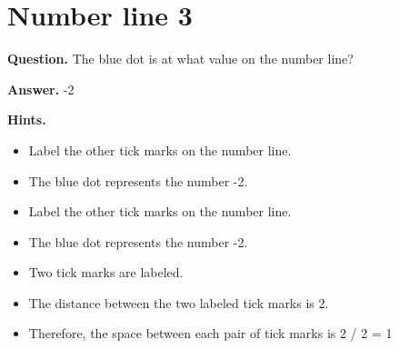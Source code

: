 \documentclass{article}
\begin{document}
\section*{Number line 3}
\textbf{Question.} The blue dot is at what value on the number line?

\textbf{Answer.} -2

\textbf{Hints.}
\begin{itemize}
  \item Label the other tick marks on the number line.
  \item The blue dot represents the number -2.
  \item Label the other tick marks on the number line.
  \item The blue dot represents the number -2.
  \item Two tick marks are labeled.
  \item The distance between the two labeled tick marks is 2.
  \item Therefore, the space between each pair of tick marks is 2 / 2 = 1
\end{itemize}
\end{document}
